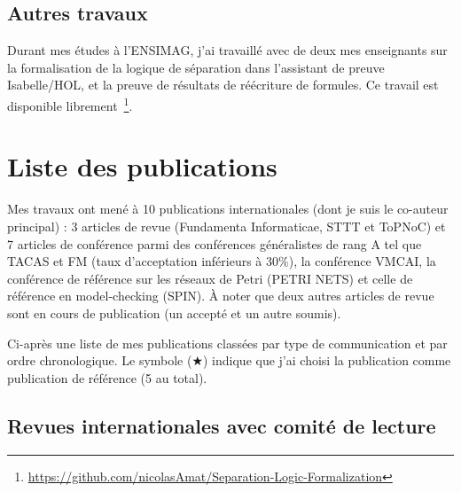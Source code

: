 \vspace{10pt}
\subsection*{Autres travaux}
\vspace{10pt}

Durant mes études à l'ENSIMAG, j'ai travaillé avec de deux mes enseignants sur
la formalisation de la logique de séparation dans l'assistant de preuve
Isabelle/HOL, et la preuve de résultats de réécriture de formules. Ce travail
est disponible
librement~\footnote{\url{https://github.com/nicolasAmat/Separation-Logic-Formalization}}.

\vspace{10pt}
\section*{Liste des publications}
\label{sec:publications}
\vspace{10pt}

Mes travaux ont mené à 10 publications internationales (dont je suis le
co-auteur principal) : 3 articles de revue (Fundamenta Informaticae, STTT et
ToPNoC) et 7 articles de conférence parmi des conférences généralistes de rang A
tel que TACAS et FM (taux d'acceptation inférieurs à 30\%), la conférence VMCAI,
la conférence de référence sur les réseaux de Petri (PETRI NETS) et celle de
référence en model-checking (SPIN). À noter que deux autres articles de revue
sont en cours de publication (un accepté et un autre soumis).
\medbreak

Ci-après une liste de mes publications classées par type de communication et
par ordre chronologique. Le symbole ($\bigstar$) indique que j'ai choisi la
publication comme publication de référence (5 au total).

\vspace{10pt}
\subsection*{Revues internationales avec comité de lecture}
\vspace{10pt}

